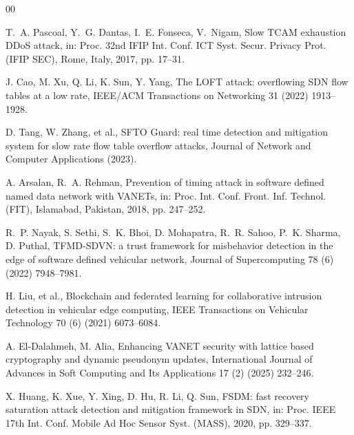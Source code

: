 \documentclass[final,5p,twocolumn]{elsarticle}
\theoremstyle{remark}
\theoremstyle{plain}
\begin{document}

\begin{thebibliography}{00}


	T.~A. Pascoal, Y.~G. Dantas, I.~E. Fonseca, V.~Nigam, Slow TCAM exhaustion DDoS attack, in: Proc. 32nd IFIP Int. Conf. ICT Syst. Secur. Privacy Prot. (IFIP SEC), Rome, Italy, 2017, pp. 17--31.

	J. Cao, M. Xu, Q. Li, K. Sun, Y. Yang, The LOFT attack: overflowing SDN flow tables at a low rate, IEEE/ACM Transactions on Networking 31 (2022) 1913--1928.

	D. Tang, W. Zhang, et al., SFTO Guard: real time detection and mitigation system for slow rate flow table overflow attacks, Journal of Network and Computer Applications (2023).

	A. Arsalan, R.~A. Rehman, Prevention of timing attack in software defined named data network with VANETs, in: Proc. Int. Conf. Front. Inf. Technol. (FIT), Islamabad, Pakistan, 2018, pp. 247--252.

	R.~P. Nayak, S. Sethi, S.~K. Bhoi, D. Mohapatra, R.~R. Sahoo, P.~K. Sharma, D. Puthal, TFMD-SDVN: a trust framework for misbehavior detection in the edge of software defined vehicular network, Journal of Supercomputing 78 (6) (2022) 7948--7981.

	H. Liu, et al., Blockchain and federated learning for collaborative intrusion detection in vehicular edge computing, IEEE Transactions on Vehicular Technology 70 (6) (2021) 6073--6084.

	A. El-Dalahmeh, M. Alia, Enhancing VANET security with lattice based cryptography and dynamic pseudonym updates, International Journal of Advances in Soft Computing and Its Applications 17 (2) (2025) 232--246.

	X. Huang, K. Xue, Y. Xing, D. Hu, R. Li, Q. Sun, FSDM: fast recovery saturation attack detection and mitigation framework in SDN, in: Proc. IEEE 17th Int. Conf. Mobile Ad Hoc Sensor Syst. (MASS), 2020, pp. 329--337.


\end{thebibliography}
\end{document}
